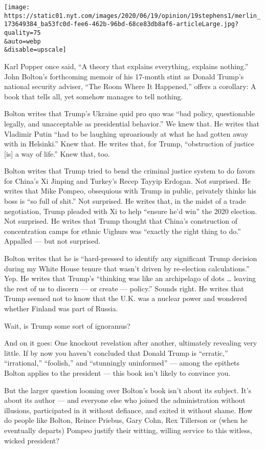 \texttt{[image: https://static01.nyt.com/images/2020/06/19/opinion/19stephens1/merlin\_173649384\_ba53fc0d-fee6-462b-96bd-68ce83db8af6-articleLarge.jpg?quality=75\\\&auto=webp\\\&disable=upscale]}

Karl Popper once said, ``A theory that explains everything, explains
nothing.'' John Bolton's forthcoming memoir of his 17-month stint as
Donald Trump's national security adviser, ``The Room Where It
Happened,'' offers a corollary: A book that tells all, yet somehow
manages to tell nothing.

Bolton writes that Trump's Ukraine quid pro quo was ``bad policy,
questionable legally, and unacceptable as presidential behavior.'' We
knew that. He writes that Vladimir Putin ``had to be laughing
uproariously at what he had gotten away with in Helsinki.'' Knew that.
He writes that, for Trump, ``obstruction of justice {[}is{]} a way of
life.'' Knew that, too.

Bolton writes that Trump tried to bend the criminal justice system to do
favors for China's Xi Jinping and Turkey's Recep Tayyip Erdogan. Not
surprised. He writes that Mike Pompeo, obsequious with Trump in public,
privately thinks his boss is ``so full of shit.'' Not surprised. He
writes that, in the midst of a trade negotiation, Trump pleaded with Xi
to help ``ensure he'd win'' the 2020 election. Not surprised. He writes
that Trump thought that China's construction of concentration camps for
ethnic Uighurs was ``exactly the right thing to do.'' Appalled --- but
not surprised.

Bolton writes that he is ``hard-pressed to identify any significant
Trump decision during my White House tenure that wasn't driven by
re-election calculations.'' Yep. He writes that Trump's ``thinking was
like an archipelago of dots \ldots{} leaving the rest of us to discern
--- or create --- policy.'' Sounds right. He writes that Trump seemed
not to know that the U.K. was a nuclear power and wondered whether
Finland was part of Russia.

Wait, is Trump some sort of ignoramus?

And on it goes: One knockout revelation after another, ultimately
revealing very little. If by now you haven't concluded that Donald Trump
is ``erratic,'' ``irrational,'' ``foolish,'' and ``stunningly
uninformed'' --- among the epithets Bolton applies to the president ---
this book isn't likely to convince you.

But the larger question looming over Bolton's book isn't about its
subject. It's about its author --- and everyone else who joined the
administration without illusions, participated in it without defiance,
and exited it without shame. How do people like Bolton, Reince Priebus,
Gary Cohn, Rex Tillerson or (when he eventually departs) Pompeo justify
their witting, willing service to this witless, wicked president?

